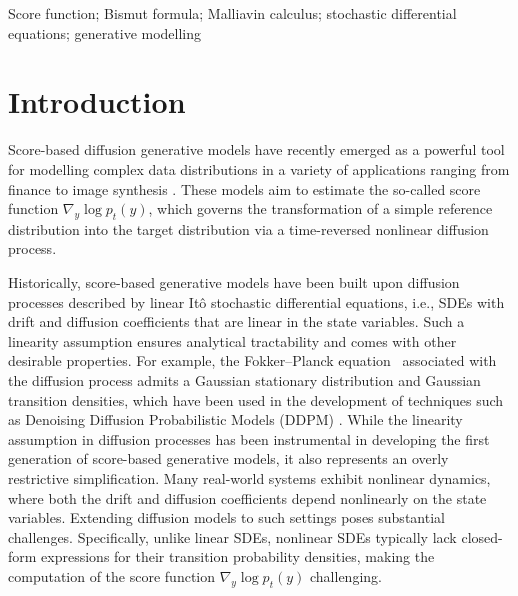 \documentclass[]{interact}
\newcommand{\1}{\mathbf{1}}
\theoremstyle{plain}%
\theoremstyle{definition}
\theoremstyle{remark}
\numberwithin{equation}{section}
\begin{document}
\begin{keywords}
Score function; Bismut formula; Malliavin calculus; stochastic differential equations; generative modelling
\end{keywords}


\section{Introduction}
\label{sec:intro}

Score-based diffusion generative models \cite{song2021scorebased,pmlr-v37-sohl-dickstein15} have recently emerged as a powerful tool for modelling complex data distributions in a variety of applications ranging from finance \cite{10.1145/3604237.3626876} to image synthesis \cite{NEURIPS2021_49ad23d1, 9878449}. These models aim to estimate the so-called score function \(\nabla_y \log p_t(y)\), which governs the transformation of a simple reference distribution into the target distribution via a time-reversed nonlinear diffusion process.

%
Historically, score-based generative models have been built upon diffusion processes described by linear It\^o stochastic differential equations, i.e., SDEs with drift and diffusion coefficients that are linear in the state variables. Such a linearity assumption ensures analytical tractability and comes with other desirable properties. For example, the Fokker--Planck equation~\cite{https://doi.org/10.1002/andp.19143480507, planck1917satz} associated with the diffusion process admits a Gaussian stationary distribution and Gaussian transition densities, which have been used in the development of techniques such as Denoising Diffusion Probabilistic Models (DDPM) \cite{NEURIPS2020_4c5bcfec}.
%
While the linearity assumption in diffusion processes has been instrumental in developing the first generation of score-based generative models, it also represents an overly restrictive simplification. Many real-world systems exhibit nonlinear dynamics, where both the drift and diffusion coefficients depend nonlinearly on the state variables. Extending diffusion models to such settings poses substantial challenges. 
%
Specifically, unlike linear SDEs, nonlinear SDEs typically lack closed-form expressions for their transition probability densities, making the 
computation of the score function \( \nabla_y \log p_t(y) \) challenging. 
\end{document}
